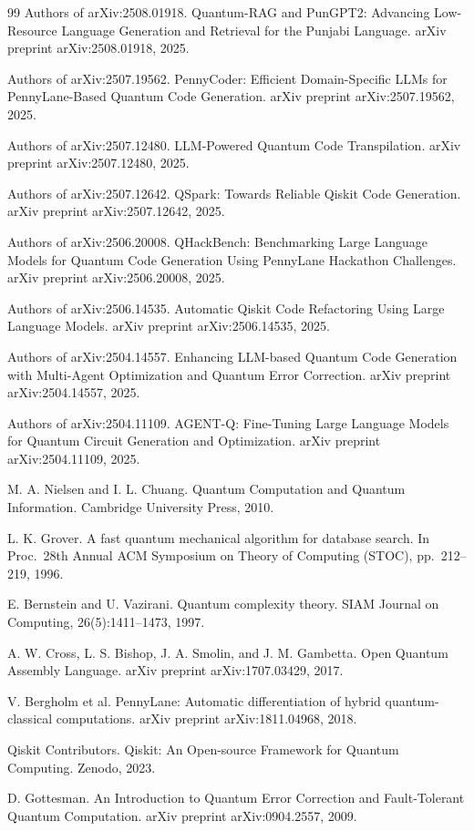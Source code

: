 \documentclass[11pt,a4paper]{article}
\newcounter{algo}
\begin{document}
\begin{thebibliography}{99}
 Authors of arXiv:2508.01918. Quantum-RAG and PunGPT2: Advancing Low-Resource Language Generation and Retrieval for the Punjabi Language. arXiv preprint arXiv:2508.01918, 2025.

 Authors of arXiv:2507.19562. PennyCoder: Efficient Domain-Specific LLMs for PennyLane-Based Quantum Code Generation. arXiv preprint arXiv:2507.19562, 2025.

 Authors of arXiv:2507.12480. LLM-Powered Quantum Code Transpilation. arXiv preprint arXiv:2507.12480, 2025.

 Authors of arXiv:2507.12642. QSpark: Towards Reliable Qiskit Code Generation. arXiv preprint arXiv:2507.12642, 2025.

 Authors of arXiv:2506.20008. QHackBench: Benchmarking Large Language Models for Quantum Code Generation Using PennyLane Hackathon Challenges. arXiv preprint arXiv:2506.20008, 2025.

 Authors of arXiv:2506.14535. Automatic Qiskit Code Refactoring Using Large Language Models. arXiv preprint arXiv:2506.14535, 2025.

 Authors of arXiv:2504.14557. Enhancing LLM-based Quantum Code Generation with Multi-Agent Optimization and Quantum Error Correction. arXiv preprint arXiv:2504.14557, 2025.

 Authors of arXiv:2504.11109. AGENT-Q: Fine-Tuning Large Language Models for Quantum Circuit Generation and Optimization. arXiv preprint arXiv:2504.11109, 2025.

 M. A. Nielsen and I. L. Chuang. Quantum Computation and Quantum Information. Cambridge University Press, 2010.

 L. K. Grover. A fast quantum mechanical algorithm for database search. In Proc.\ 28th Annual ACM Symposium on Theory of Computing (STOC), pp.\ 212--219, 1996.

 E. Bernstein and U. Vazirani. Quantum complexity theory. SIAM Journal on Computing, 26(5):1411--1473, 1997.

 A. W. Cross, L. S. Bishop, J. A. Smolin, and J. M. Gambetta. Open Quantum Assembly Language. arXiv preprint arXiv:1707.03429, 2017.

 V. Bergholm et al. PennyLane: Automatic differentiation of hybrid quantum-classical computations. arXiv preprint arXiv:1811.04968, 2018.

 Qiskit Contributors. Qiskit: An Open-source Framework for Quantum Computing. Zenodo, 2023.

 D. Gottesman. An Introduction to Quantum Error Correction and Fault-Tolerant Quantum Computation. arXiv preprint arXiv:0904.2557, 2009.

\end{thebibliography}
\end{document}
